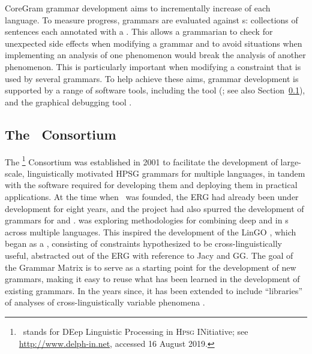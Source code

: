 \documentclass[output=paper
	        ,collection
	        ,collectionchapter
 	        ,biblatex
                ,babelshorthands
                ,newtxmath
                ,draftmode
                ,colorlinks, citecolor=brown
]{langscibook}
\begin{document}
CoreGram grammar development aims to incrementally increase  of each language.
To measure progress, grammars are evaluated against s:
collections of sentences each annotated with a  \citep{ONK97a,Mueller2004f}.
This allows a grammarian to check for unexpected side effects when modifying a grammar and
to avoid situations when implementing an analysis of one phenomenon
would break the analysis of another phenomenon.
This is particularly important when modifying a constraint that is used by several grammars.
To help achieve these aims, grammar development is supported by a range of software tools,
including the  tool \itsdb\is{\itsdb} (\citealp{Oepen:01}; see also Section~\ref{cl:delphin}),
and the graphical debugging tool  \citep{DER2010a-u,DER2013a}.

\subsection{The \delphin\ Consortium}
\label{cl:delphin}


The \delphin\footnote{\delphin\ stands for DEep Linguistic
  Processing in \textsc{Hpsg} INitiative; see \url{http://www.delph-in.net}, accessed 16 August 2019.} Consortium
was established in 2001 to facilitate the development of large-scale,
linguistically motivated HPSG grammars for multiple languages, in tandem
with the software required for developing them and deploying them in
practical applications. At the time when \delphin\ was founded, the
ERG
\citep{Flickinger2000a,Flickinger2011a-u} had already been under
development for eight years, and the \verbmobil project
\citep{Wahlster2000a-ed} had also spurred the development of grammars for
 \citep[GG;][]{MK2000a,Crysmann2003b} and 
\citep*[Jacy;][]{SBB2016a}. 
\citep*{Callmeier-etal:2004} was exploring methodologies for combining
deep and  in s across multiple
languages. This inspired the development of the LinGO 
\citep*{BFO2002a-u}, which began as a , consisting of
constraints hypothesized to be cross-linguistically useful, abstracted
out of the ERG with reference to Jacy and GG. The goal of the Grammar
Matrix is to serve as a starting point for the development of new
grammars, making it easy to reuse what has been learned in the
development of existing grammars. In the years since, it has been
extended to include ``libraries'' of analyses of cross-linguistically
variable phenomena \citep[e.g.,][]{Drellishak2009a-u,BDFPS2010a-u}.
\end{document}
